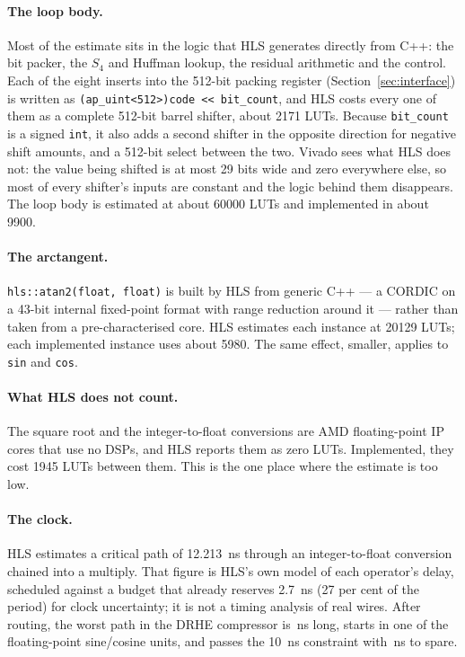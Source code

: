 \paragraph{The loop body.} Most of the estimate sits in the logic that HLS
generates directly from C++: the bit packer, the $S_4$ and Huffman lookup, the
residual arithmetic and the control. Each of the eight inserts into the
512-bit packing register (Section~\ref{sec:interface}) is written as
\texttt{(ap\_uint<512>)code << bit\_count}, and HLS costs every one of them as a
complete 512-bit barrel shifter, about \num{2171} LUTs. Because
\texttt{bit\_count} is a signed \texttt{int}, it also adds a second shifter in
the opposite direction for negative shift amounts, and a 512-bit select between
the two. Vivado sees what HLS does not: the value being shifted is at most 29
bits wide and zero everywhere else, so most of every shifter's inputs are
constant and the logic behind them disappears. The loop body is estimated at
about \num{60000} LUTs and implemented in about \num{9900}.

\paragraph{The arctangent.} \texttt{hls::atan2(float, float)} is built by HLS
from generic C++ --- a CORDIC on a 43-bit internal fixed-point format with range
reduction around it --- rather than taken from a pre-characterised core. HLS
estimates each instance at \num{20129} LUTs; each implemented instance uses
about \num{5980}. The same effect, smaller, applies to \texttt{sin} and
\texttt{cos}.

\paragraph{What HLS does not count.} The square root and the integer-to-float
conversions are AMD floating-point IP cores that use no DSPs, and HLS reports
them as zero LUTs. Implemented, they cost \num{1945} LUTs between them. This is
the one place where the estimate is too low.

\paragraph{The clock.} HLS estimates a critical path of
\SI{12.213}{\nano\second} through an integer-to-float conversion chained into a
multiply. That figure is HLS's own model of each operator's delay, scheduled
against a budget that already reserves \SI{2.7}{\nano\second} (27 per cent of
the period) for clock uncertainty; it is not a timing analysis of real wires.
After routing, the worst path in the DRHE compressor is
\,ns long, starts in one of the floating-point sine/cosine
units, and passes the \SI{10}{\nano\second} constraint with
\,ns to spare.

